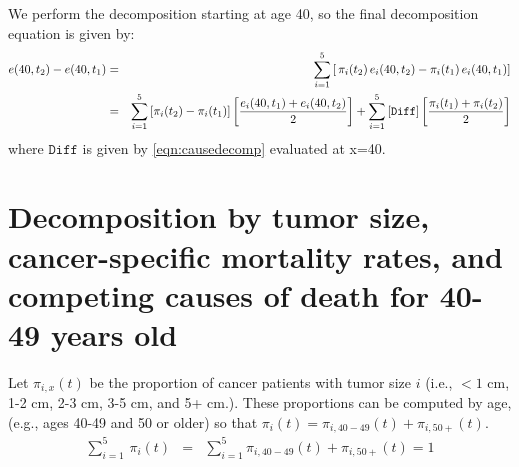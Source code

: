 \documentclass[twoside]{article}
\newcommand{\mysection}[1]{\addtocounter{section}{1}\section*{#1}}
\begin{document}


We perform the decomposition starting at age 40, so the final decomposition equation is given by:
\begin{eqnarray}
  e(40,t_2)-e(40,t_1)&=&\sum_{i=1}^{5}\left[\,\pi_i(t_2)\,e_i(40,t_2)- \pi_i(t_1)\,e_i(40,t_1)\right] \notag \\
  &=&\sum_{i=1}^{5}\left[\pi_i(t_2)-\pi_i(t_1) \right]\left[\frac{e_i(40,t_1)+e_i(40,t_2)}{2}\right]+\sum_{i=1}^{5}\left[\mathtt{Diff} \right]\left[\frac{\pi_i(t_1)+\pi_i(t_2)}{2}\right] 
\end{eqnarray}
where $\mathtt{Diff}$ is given by \eqref{eqn:causedecomp} evaluated at x=40.

\mysection{Decomposition by tumor size, cancer-specific mortality rates, and competing causes of death for 40-49 years old}
Let $\pi_{i,x}(t)$ be the proportion of cancer patients with tumor size $i$ (i.e., $<1$ cm, 1-2 cm, 2-3 cm, 3-5 cm, and 5+ cm.). These proportions can be computed by age, (e.g., ages 40-49 and 50 or older) so that $\pi_i(t)=\pi_{i,40-49}(t)+\pi_{i,50+}(t)$.  
\begin{eqnarray}
\sum_{i=1}^{5}\,\pi_i(t)&=&\sum_{i=1}^{5}\pi_{i,40-49}(t)+\pi_{i,50+}(t)=1  
\end{eqnarray}
\end{document}

